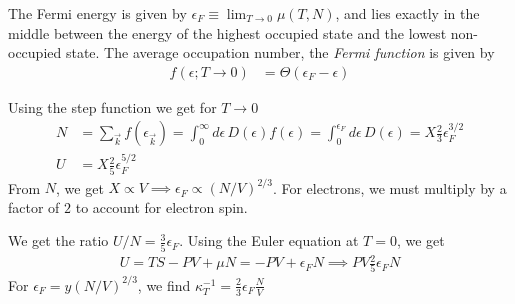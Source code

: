 \documentclass[a4paper, english, 12pt]{article}
\newcommand{\eps}{\epsilon}
\begin{document}
\begin{multicols*}{2}
The Fermi energy is given by $\eps_F \equiv \lim_{T\to0} \mu(T,N)$, and lies exactly in the middle between the energy of the highest occupied state and the lowest non-occupied state. The average occupation number, the \textit{Fermi function} is given by 
\begin{align*}
    f(\eps; T\to0) &= \Theta(\eps_F-\eps)
\end{align*}

Using the step function we get for $T\to0$ 
\begin{align*}
    N&=\sum_{\vec{k}} f(\eps_{\vec{k}}) = \int_0^\infty d\eps\, D(\eps)f(\eps) = \int_0^{\eps_F} d\eps\, D(\eps) = X \frac{2}{3} \eps_F^{3/2} \\ 
    U&=X \frac{2}{5} \eps_F^{5/2}
\end{align*}
From $N$, we get $X\propto V\implies \eps_F \propto(N/V)^{2/3}$. For electrons, we must multiply by a factor of $2$ to account for electron spin. 

We get the ratio $U/N=\frac{3}{5}\eps_F$. Using the Euler equation at $T=0$, we get 
\begin{align*}
    U=TS-PV+\mu N = -PV+\eps_F N \implies PV \frac{2}{5}\eps_F N 
\end{align*}
For $\eps_F=y(N/V)^{2/3}$, we find $\kappa_T^{-1}=\frac{2}{3}\eps_F \frac{N}{V}$




\end{multicols*}
\end{document}
